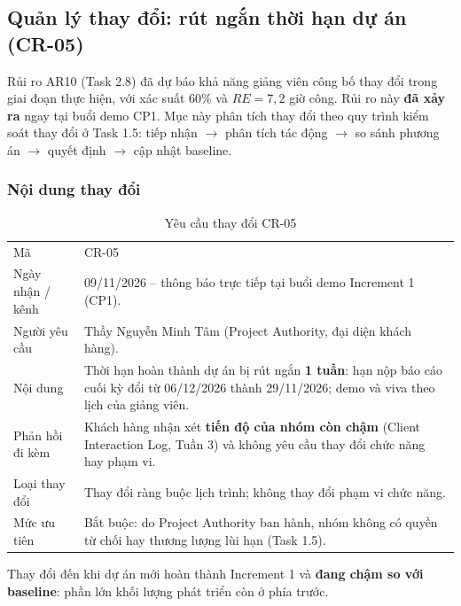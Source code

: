 \subsection{Quản lý thay đổi: rút ngắn thời hạn dự án (CR-05)}
\label{sec:t3-change}

Rủi ro AR10 (Task 2.8) đã dự báo khả năng giảng viên công bố thay đổi trong giai đoạn thực hiện, với xác suất 60\% và $RE = 7{,}2$ giờ công. Rủi ro này \textbf{đã xảy ra} ngay tại buổi demo CP1. Mục này phân tích thay đổi theo quy trình kiểm soát thay đổi ở Task 1.5: tiếp nhận $\to$ phân tích tác động $\to$ so sánh phương án $\to$ quyết định $\to$ cập nhật baseline.

\subsubsection{Nội dung thay đổi}

\begin{table}[H]
\centering\small
\caption{Yêu cầu thay đổi CR-05}\label{tab:t3-cr05}
\begin{tabularx}{\linewidth}{@{}p{.24\linewidth}X@{}}
\toprule
Mã & CR-05\\
Ngày nhận / kênh & 09/11/2026 -- thông báo trực tiếp tại buổi demo Increment 1 (CP1).\\
Người yêu cầu & Thầy Nguyễn Minh Tâm (Project Authority, đại diện khách hàng).\\
Nội dung & Thời hạn hoàn thành dự án bị rút ngắn \textbf{1 tuần}: hạn nộp báo cáo cuối kỳ đổi từ 06/12/2026 thành 29/11/2026; demo và viva theo lịch của giảng viên.\\
Phản hồi đi kèm & Khách hàng nhận xét \textbf{tiến độ của nhóm còn chậm} (Client Interaction Log, Tuần 3) và không yêu cầu thay đổi chức năng hay phạm vi.\\
Loại thay đổi & Thay đổi ràng buộc lịch trình; không thay đổi phạm vi chức năng.\\
Mức ưu tiên & Bắt buộc: do Project Authority ban hành, nhóm không có quyền từ chối hay thương lượng lùi hạn (Task 1.5).\\
\bottomrule
\end{tabularx}
\end{table}


Thay đổi đến khi dự án mới hoàn thành Increment 1 và \textbf{đang chậm so với baseline}: phần lớn khối lượng phát triển còn ở phía trước.

